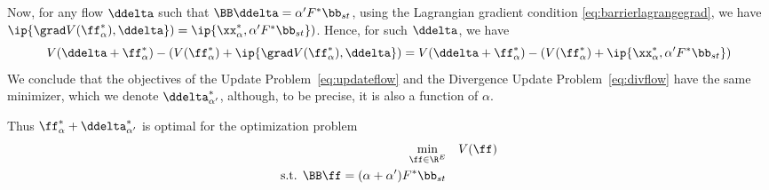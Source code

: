 Now, for any flow $\ddelta$ such that $\BB\ddelta = \alpha' F^*
\bb_{st}$, using the Lagrangian gradient condition
\eqref{eq:barrierlagrangegrad},
we have
$\ip{\grad V(\ff^*_{\alpha}), \ddelta}) = \ip{\xx^*_{\alpha}, \alpha' F^*
  \bb_{st}})$.
Hence, for such $\ddelta$, we have 
\[
    V(\ddelta+\ff^*_{\alpha})
  -
\left(
  V(\ff^*_{\alpha})
  +
  \ip{\grad V(\ff^*_{\alpha}), \ddelta}
\right)
=
    V(\ddelta+\ff^*_{\alpha})
  -
\left(
 V(\ff^*_{\alpha})
  +
\ip{\xx^*_{\alpha}, \alpha' F^*\bb_{st}}
\right)
\]
We conclude that the objectives of the Update
Problem~\eqref{eq:updateflow} and the Divergence Update
Problem~\eqref{eq:divflow} have the same minimizer, which we denote
$\ddelta^*_{\alpha'}$, although, to be precise, it is also a function of $\alpha$.




Thus $\ff^*_{\alpha}+\ddelta^*_{\alpha'}$ is optimal for the
optimization problem
  \begin{equation}
   \label{eq:barrierflowupdated}
\begin{aligned}
\min_{\ff \in \R^E} & \quad V(\ff)\\
\textrm{s.t. }  \BB\ff= (\alpha+\alpha') F^* \bb_{st}
\end{aligned}
\end{equation}

